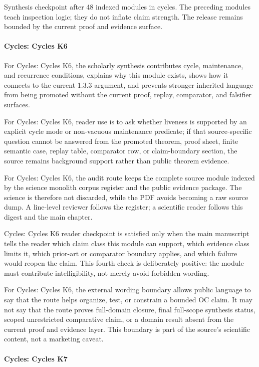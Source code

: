 Synthesis checkpoint after 48 indexed modules in cycles. The preceding modules teach inspection logic; they do not inflate claim strength. The release remains bounded by the current proof and evidence surface.


\paragraph{Cycles: Cycles K6}

For Cycles: Cycles K6, the scholarly synthesis contributes cycle, maintenance, and recurrence conditions, explains why this module exists, shows how it connects to the current 1.3.3 argument, and prevents stronger inherited language from being promoted without the current proof, replay, comparator, and falsifier surfaces.


For Cycles: Cycles K6, reader use is to ask whether liveness is supported by an explicit cycle mode or non-vacuous maintenance predicate; if that source-specific question cannot be answered from the promoted theorem, proof sheet, finite semantic case, replay table, comparator row, or claim-boundary section, the source remains background support rather than public theorem evidence.


For Cycles: Cycles K6, the audit route keeps the complete source module indexed by the science monolith corpus register and the public evidence package. The science is therefore not discarded, while the PDF avoids becoming a raw source dump. A line-level reviewer follows the register; a scientific reader follows this digest and the main chapter.


Cycles: Cycles K6 reader checkpoint is satisfied only when the main manuscript tells the reader which claim class this module can support, which evidence class limits it, which prior-art or comparator boundary applies, and which failure would reopen the claim. This fourth check is deliberately positive: the module must contribute intelligibility, not merely avoid forbidden wording.


For Cycles: Cycles K6, the external wording boundary allows public language to say that the route helps organize, test, or constrain a bounded OC claim. It may not say that the route proves full-domain closure, final full-scope synthesis status, scoped unrestricted comparative claim, or a domain result absent from the current proof and evidence layer. This boundary is part of the source's scientific content, not a marketing caveat.


\paragraph{Cycles: Cycles K7}

